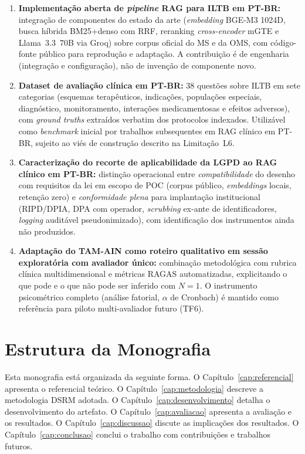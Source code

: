 \documentclass[
  12pt,
  oneside,
  a4paper,
  english,
  brazil
]{abntex2}
\begin{document}
\begin{enumerate}[label=\textbf{C\arabic*}]
  \item \textbf{Implementação aberta de \textit{pipeline} RAG para ILTB em
        PT-BR:} integração de componentes do estado da arte
        (\textit{embedding} BGE-M3 1024D, busca híbrida BM25+denso com RRF,
        reranking \textit{cross-encoder} mGTE e Llama~3.3~70B via Groq)
        sobre corpus oficial do MS e da OMS, com código-fonte público para
        reprodução e adaptação. A contribuição é de engenharia
        (integração e configuração), não de invenção de componente novo.
  \item \textbf{Dataset de avaliação clínica em PT-BR:} 38 questões sobre
        ILTB em sete categorias (esquemas terapêuticos, indicações,
        populações especiais, diagnóstico, monitoramento, interações
        medicamentosas e efeitos adversos), com \textit{ground truths}
        extraídos verbatim dos protocolos indexados. Utilizável como
        \textit{benchmark} inicial por trabalhos subsequentes em RAG
        clínico em PT-BR, sujeito ao viés de construção descrito na
        Limitação~L6.
  \item \textbf{Caracterização do recorte de aplicabilidade da LGPD ao RAG
        clínico em PT-BR:} distinção operacional entre \emph{compatibilidade}
        do desenho com requisitos da lei em escopo de POC (corpus público,
        \textit{embeddings} locais, retenção zero) e \emph{conformidade
        plena} para implantação institucional (RIPD/DPIA, DPA com operador,
        \textit{scrubbing} ex-ante de identificadores, \textit{logging}
        auditável pseudonimizado), com identificação dos instrumentos
        ainda não produzidos.
  \item \textbf{Adaptação do TAM-AIN como roteiro qualitativo em sessão
        exploratória com avaliador único:} combinação metodológica com
        rubrica clínica multidimensional e métricas RAGAS automatizadas,
        explicitando o que pode e o que não pode ser inferido com $N=1$.
        O instrumento psicométrico completo (análise fatorial, $\alpha$ de
        Cronbach) é mantido como referência para piloto multi-avaliador
        futuro (TF6).
\end{enumerate}

\section{Estrutura da Monografia}

Esta monografia está organizada da seguinte forma. O
Capítulo~\ref{cap:referencial} apresenta o referencial teórico. O
Capítulo~\ref{cap:metodologia} descreve a metodologia DSRM adotada. O
Capítulo~\ref{cap:desenvolvimento} detalha o desenvolvimento do artefato. O
Capítulo~\ref{cap:avaliacao} apresenta a avaliação e os resultados. O
Capítulo~\ref{cap:discussao} discute as implicações dos resultados. O
Capítulo~\ref{cap:conclusao} conclui o trabalho com contribuições e trabalhos
futuros.
\end{document}
